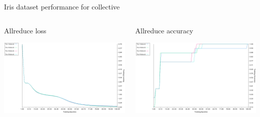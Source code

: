 \documentclass[presentation]{beamer}
\begin{document}
\begin{frame}[label={sec:org1c71325}]{Iris dataset performance for collective}
\begin{columns}
\begin{column}{0.6\columnwidth}
\begin{block}{Allreduce loss}
\begin{center}
\includegraphics[width=.9\linewidth]{./png/iris_allreduce_loss.png}
\end{center}
\end{block}
\end{column}
\begin{column}{0.6\columnwidth}
\begin{block}{Allreduce accuracy}
\begin{center}
\includegraphics[width=.9\linewidth]{./png/iris_allreduce_accuracy.png}
\end{center}
\end{block}
\end{column}
\end{columns}
\end{frame}
\end{document}
